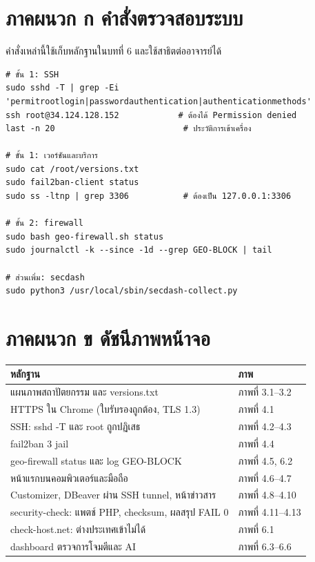 
\section*{ภาคผนวก ก คำสั่งตรวจสอบระบบ}

คำสั่งเหล่านี้ใช้เก็บหลักฐานในบทที่ 6 และใช้สาธิตต่ออาจารย์ได้

\begin{Verbatim}[breaklines,breakanywhere,fontsize=\small,frame=single,framesep=6pt]
# ขั้น 1: SSH
sudo sshd -T | grep -Ei 'permitrootlogin|passwordauthentication|authenticationmethods'
ssh root@34.124.128.152            # ต้องได้ Permission denied
last -n 20                          # ประวัติการเข้าเครื่อง

# ขั้น 1: เวอร์ชันและบริการ
sudo cat /root/versions.txt
sudo fail2ban-client status
sudo ss -ltnp | grep 3306           # ต้องเป็น 127.0.0.1:3306

# ขั้น 2: firewall
sudo bash geo-firewall.sh status
sudo journalctl -k --since -1d --grep GEO-BLOCK | tail

# ส่วนเพิ่ม: secdash
sudo python3 /usr/local/sbin/secdash-collect.py
\end{Verbatim}

\section*{ภาคผนวก ข ดัชนีภาพหน้าจอ}

\begingroup\small\begin{longtable}[]{@{}>{\raggedright\arraybackslash}p{}>{\raggedright\arraybackslash}p{}@{}}
\toprule\noalign{}
หลักฐาน & ภาพ \\
\midrule\noalign{}
\endhead
\bottomrule\noalign{}
\endlastfoot
แผนภาพสถาปัตยกรรม และ versions.txt & ภาพที่ 3.1--3.2 \\
HTTPS ใน Chrome (ใบรับรองถูกต้อง, TLS 1.3) & ภาพที่ 4.1 \\
SSH: sshd -T และ root ถูกปฏิเสธ & ภาพที่ 4.2--4.3 \\
fail2ban 3 jail & ภาพที่ 4.4 \\
geo-firewall status และ log GEO-BLOCK & ภาพที่ 4.5, 6.2 \\
หน้าแรกบนคอมพิวเตอร์และมือถือ & ภาพที่ 4.6--4.7 \\
Customizer, DBeaver ผ่าน SSH tunnel, หน้าข่าวสาร & ภาพที่ 4.8--4.10 \\
security-check: แพตช์ PHP, checksum, ผลสรุป FAIL 0 & ภาพที่ 4.11--4.13 \\
check-host.net: ต่างประเทศเข้าไม่ได้ & ภาพที่ 6.1 \\
dashboard ตรวจการโจมตีและ AI & ภาพที่ 6.3--6.6 \\
\end{longtable}\endgroup

